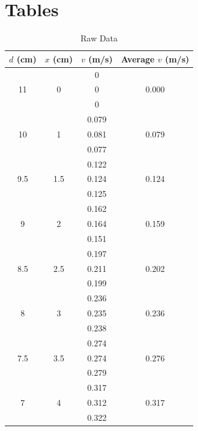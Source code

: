 \section{Tables}
\begin{table}
    \centering
    \begin{tabular}{|c|c|c|c|}
        \hline
        $d$ (cm) & $x$ (cm) & $v$ (m/s) & Average $v$ (m/s) \\
        \hline
         & & 0 & \\
        11 & 0 & 0 & 0.000 \\
         & & 0 & \\
        \hline
         & & 0.079 & \\
        10 & 1 & 0.081 & 0.079 \\
         & & 0.077 & \\
        \hline
         & & 0.122 & \\
        9.5 & 1.5 & 0.124 & 0.124 \\
         & & 0.125 & \\
        \hline
         & & 0.162 & \\
        9 & 2 & 0.164 & 0.159 \\
         & & 0.151 & \\
        \hline
         & & 0.197 & \\
        8.5 & 2.5 & 0.211 & 0.202 \\
         & & 0.199 & \\
        \hline
         & & 0.236 & \\
        8 & 3 & 0.235 & 0.236 \\
         & & 0.238 & \\
        \hline
         & & 0.274 & \\
        7.5 & 3.5 & 0.274 & 0.276 \\
         & & 0.279 & \\
        \hline
         & & 0.317 & \\
        7 & 4 & 0.312 & 0.317 \\
         & & 0.322 & \\
        \hline
    \end{tabular}
    \caption{Raw Data}
    \label{table:06.data}
\end{table}
\FloatBarrier
\newpage
